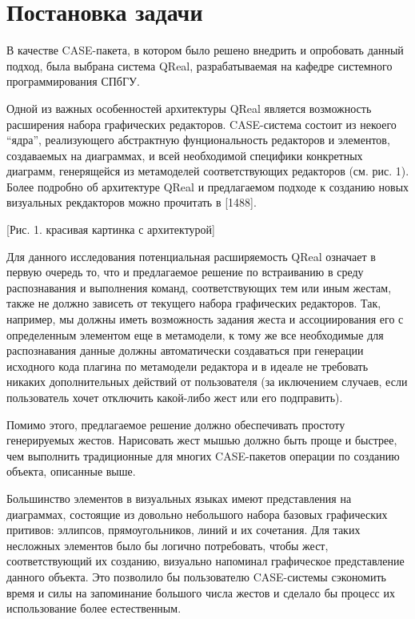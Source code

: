 \documentclass[a5paper]{article}
\begin{document}
\section{Постановка задачи}
В качестве CASE-пакета, в котором было решено внедрить и опробовать данный подход, была выбрана система QReal, разрабатываемая на кафедре 
системного программирования СПбГУ. 

Одной из важных особенностей архитектуры QReal является возможность расширения набора графических редакторов. CASE-система состоит из 
некоего ``ядра'', реализующего абстрактную фунциональность редакторов и элементов, создаваемых на диаграммах, и всей необходимой специфики 
конкретных диаграмм, генерящейся из метамоделей соответствующих редакторов (см. рис. 1). Более подробно об архитектуре QReal и предлагаемом 
подходе к  созданию новых визуальных рекдакторов можно прочитать в [1488]. 

[Рис. 1. красивая картинка с архитектурой]

Для данного исследования потенциальная расширяемость QReal означает в первую очередь то, что и предлагаемое решение по встраиванию в среду 
распознавания и выполнения команд, соответствующих тем или иным жестам, также не должно зависеть от текущего набора графических редакторов. 
Так, например, мы должны иметь возможность задания жеста и ассоциирования его с определенным элементом еще в метамодели, к тому же все 
необходимые для распознавания данные должны автоматически создаваться при генерации исходного кода плагина по метамодели редактора и в 
идеале не требовать никаких дополнительных действий от пользователя (за иключением случаев, если пользователь хочет отключить какой-либо 
жест или его подправить).

Помимо этого, предлагаемое решение должно обеспечивать простоту генерируемых жестов. Нарисовать жест мышью должно быть проще и быстрее, 
чем выполнить традиционные для многих CASE-пакетов операции по созданию объекта, описанные выше. 

Большинство элементов в визуальных языках имеют представления на диаграммах, состоящие из довольно небольшого набора базовых графических 
притивов: эллипсов, прямоугольников, линий и их сочетания. Для таких несложных элементов было бы логично потребовать, чтобы жест, 
соответствующий их созданию, визуально напоминал графическое представление данного объекта. Это позволило бы пользователю CASE-системы 
сэкономить время и силы на запоминание большого числа жестов и сделало бы процесс их использование более естественным. 
\end{document}
